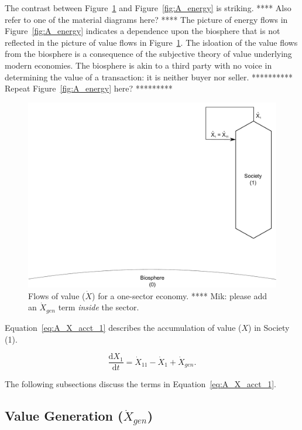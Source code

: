 The contrast between Figure~\ref{fig:A_value} and Figure~\ref{fig:A_energy}
is striking. **** Also refer to one of the material diagrams here? ****
The picture of energy flows in Figure~\ref{fig:A_energy} indicates a dependence
upon the biosphere that is not reflected in the picture of
value flows in Figure~\ref{fig:A_value}.
The isloation of the value flows from the biosphere is a consequence
of the subjective theory of value 
underlying modern economies.
The biosphere is akin to a third party with no voice 
in determining the value of a transaction:
it is neither buyer nor seller. 
********** Repeat Figure~\ref{fig:A_energy} here? *********

\begin{figure}[h!]
\centering
\includegraphics[width=0.8\linewidth]{Part_3/Chapter_Values/images/1_sector_value.pdf}
\caption{Flows of value ($\dot{X}$) for a one-sector economy. 
**** Mik: please add an $\dot{X}_{gen}$ term \emph{inside} the sector.}
\label{fig:A_value} 
\end{figure}

Equation~\ref{eq:A_X_acct_1} describes the accumulation 
of value
($X$) in Society (1).

\begin{equation} \label{eq:A_X_acct_1}
	\frac{\mathrm{d}X_{1}}{\mathrm{d}t} 
	= \dot{X}_{11} 
	- \dot{X}_{1}
	+ \dot{X}_{gen}.
\end{equation}

The following subsections discuss the terms in Equation~\ref{eq:A_X_acct_1}.


\subsection{Value Generation ($\dot{X}_{gen}$)}

